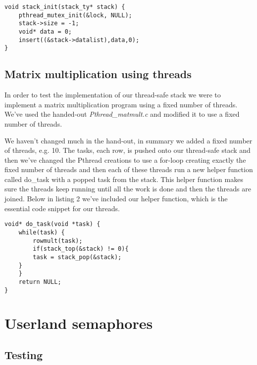\documentclass[12pt,a4paper,danish]{article}
\begin{document}
\begin{lstlisting}[caption=The stack\_init implementation]
void stack_init(stack_ty* stack) {
    pthread_mutex_init(&lock, NULL);
    stack->size = -1;
    void* data = 0;
    insert((&stack->datalist),data,0);
}
\end{lstlisting}
\subsection{Matrix multiplication using threads}
In order to test the implementation of our thread-safe stack we were to implement a matrix multiplication program using a fixed number of threads. We've used the handed-out \textit{Pthread\_matmult.c} and modified it to use a fixed number of threads.

We haven't changed much in the hand-out, in summary we added a fixed number of threads, e.g. 10. The tasks, each row, is pushed onto our thread-safe stack and then we've changed the Pthread creations to use a for-loop creating exactly the fixed number of threads and then each of these threads run a new helper function called do\_task with a popped task from the stack. This helper function makes sure the threads keep running until all the work is done and then the threads are joined. Below in listing 2 we've included our helper function, which is the essential code snippet for our threads.
\begin{lstlisting}[caption=The helper function do\_task]
void* do_task(void *task) {
    while(task) {
        rowmult(task);
        if(stack_top(&stack) != 0){
        task = stack_pop(&stack);
    }
    }
    return NULL;
}
\end{lstlisting}

\section{Userland semaphores}

\subsection{Testing}
\end{document}
